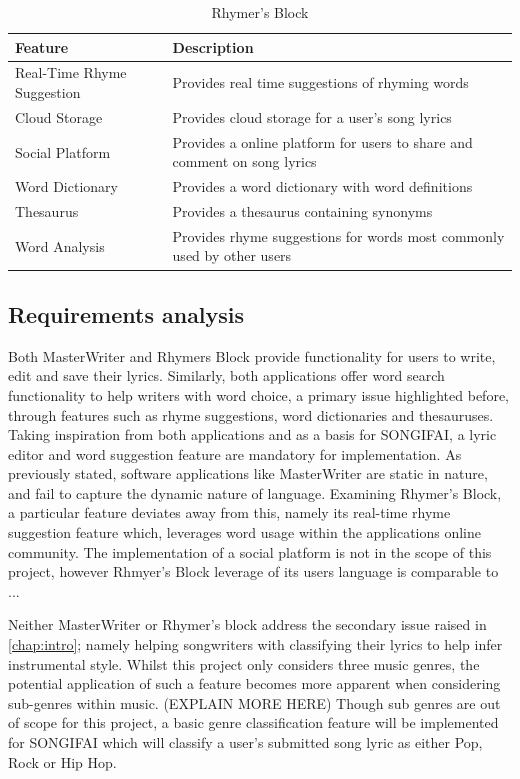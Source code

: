 \begin{table}[ht]
	\caption{Rhymer's Block}
	\centering
	\begin{tabular}{ | l | p{10cm} |}
		\hline
		\textbf{Feature} & \textbf{Description}\\ \hline
		Real-Time Rhyme Suggestion & Provides real time suggestions of rhyming words \\ \hline
		Cloud Storage & Provides cloud storage for a user's song lyrics \\ \hline
		Social Platform & Provides a online platform for users to share and comment on song lyrics\\ \hline
		Word Dictionary & Provides a word dictionary with word definitions \\ \hline
		Thesaurus & Provides a thesaurus containing synonyms\\ \hline
		Word Analysis & Provides rhyme suggestions for words most commonly used by other users \\ \hline
	\end{tabular}
	\label{Tab:RhymersBlock}
\end{table}

\subsection{Requirements analysis}
Both MasterWriter and Rhymers Block provide functionality for users to write, edit and save their lyrics. Similarly, both applications offer word search functionality to help writers with word choice, a primary issue highlighted before, through features such as rhyme suggestions, word dictionaries and thesauruses. Taking inspiration from both applications and as a basis for SONGIFAI, a lyric editor and word suggestion feature are mandatory for implementation. As previously stated, software applications like MasterWriter are static in nature, and fail to capture the dynamic nature of language. Examining Rhymer's Block, a particular feature deviates away from this, namely its real-time rhyme suggestion feature which, leverages word usage within the applications online community. The implementation of a social platform is not in the scope of this project, however Rhmyer's Block leverage of its users language is comparable to ... 

\noindent
\newline
Neither MasterWriter or Rhymer's block address the secondary issue raised in \autoref{chap:intro}; namely helping songwriters with classifying their lyrics to help infer instrumental style. Whilst this project only considers three music genres, the potential application of such a feature becomes more apparent when considering sub-genres within music. (EXPLAIN MORE HERE) Though sub genres are out of scope for this project, a basic genre classification feature will be implemented for SONGIFAI which will classify a user's submitted song lyric as either Pop, Rock or Hip Hop.

